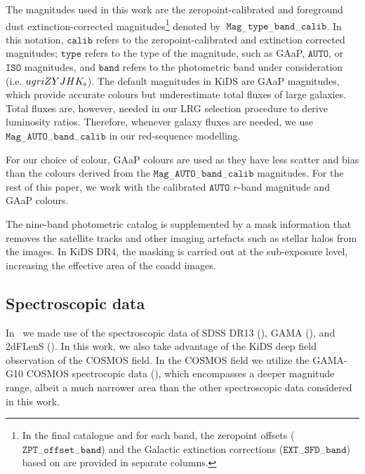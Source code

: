 \documentclass[fleqn,usenatbib,useAMS]{mnras}
\begin{document}
The magnitudes used in this work are the zeropoint-calibrated and foreground dust extinction-corrected magnitudes\footnote{In the final catalogue and for each band, the zeropoint offsets ($\mathtt{ZPT}_{-}\mathtt{offset}_{-}\mathtt{band}$) and the Galactic extinction corrections ($\mathtt{EXT}_{-}\mathtt{SFD}_{-}\mathtt{band}$) based on \citet{schlegel98} are provided in separate columns.} 
denoted by $\; \mathtt{Mag}_{-}\mathtt{type}_{-}\mathtt{band}_{-}\mathtt{calib}$. 
In this notation, $\mathtt{calib}$ refers to the zeropoint-calibrated and extinction corrected magnitudes; $\mathtt{type}$ refers to the type of the magnitude, such as GAaP, $\mathtt{AUTO}$, or $\mathtt{ISO}$ magnitudes, and $\mathtt{band}$ refers to the photometric band under consideration (i.e. $ugriZYJHK_{\rm s}$). The default magnitudes in KiDS are GAaP magnitudes, which provide accurate colours but underestimate total fluxes of large galaxies. Total fluxes are, however, needed in our LRG selection procedure to derive luminosity ratios. Therefore, whenever galaxy fluxes are needed, we use $\mathtt{Mag}_{-}\mathtt{AUTO}_{-}\mathtt{band}_{-}\mathtt{calib}$ in our red-sequence modelling. 

For our choice of colour, GAaP colours are used as they have less scatter and bias than the colours derived from the $\mathtt{Mag}_{-}\mathtt{AUTO}_{-}\mathtt{band}_{-}\mathtt{calib}$ magnitudes. For the rest of this paper, we work with the calibrated $\mathtt{AUTO}$ $r$-band magnitude and GAaP colours. 

The nine-band photometric catalog is supplemented by a mask information that removes the satellite tracks and other imaging artefacts such as stellar halos from the images. In KiDS DR4, the masking is carried out at the sub-exposure level, increasing the effective area of the coadd images. 

\subsection{Spectroscopic data}\label{sec:spec}

In~\citet{vakili2019} we made use of the spectroscopic data of SDSS DR13 (\citealt{sdss_dr13}), GAMA (\citealt{driver2011}), and 2dFLenS (\citealt{blake2016}). In this work, we also take advantage of the KiDS deep field observation of the COSMOS field. In the COSMOS field we utilize the GAMA-G10 COSMOS spectrocopic data (\citealt{davis2017}), which encompasses a deeper magnitude range, albeit a much narrower area than the other spectroscopic data considered in this work.
\end{document}
